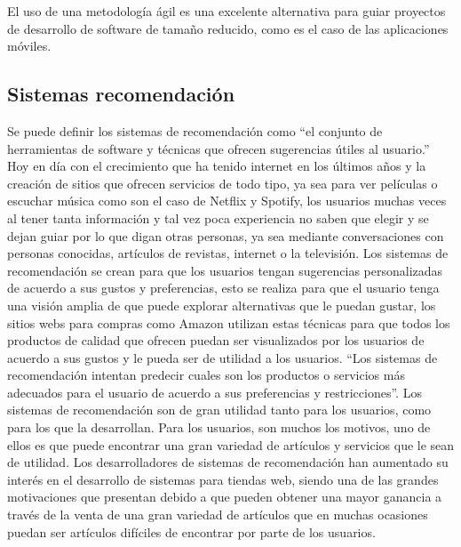 \documentclass[12pt,letterpaper,openany]{book}
\begin{document}
El uso de una metodología ágil es una excelente alternativa para guiar proyectos de desarrollo de software de tamaño reducido, como es el caso de las aplicaciones móviles. 

\subsection{Sistemas recomendación}
Se puede definir los sistemas de recomendación como “el conjunto de herramientas de software y técnicas que ofrecen sugerencias útiles al usuario.” Hoy en día con el crecimiento que ha tenido internet en los últimos años y la creación de sitios que ofrecen servicios de todo tipo, ya sea para ver películas o escuchar música como son el caso de Netflix y Spotify, los usuarios muchas veces al tener tanta información y tal vez poca experiencia no saben que elegir y se dejan guiar por lo que digan otras personas, ya sea mediante conversaciones con personas conocidas, artículos de revistas, internet o la televisión.
\vspace{5mm}\newline
Los sistemas de recomendación se crean para que los usuarios tengan sugerencias personalizadas de acuerdo a sus gustos y preferencias, esto se realiza para que el usuario tenga una visión amplia de que puede explorar alternativas que le puedan gustar, los sitios webs para compras como Amazon utilizan estas técnicas para que todos los productos de calidad que ofrecen puedan ser visualizados por los usuarios de acuerdo a sus gustos y le pueda ser de utilidad a los usuarios. “Los sistemas de recomendación intentan predecir cuales son los productos o servicios más adecuados para el usuario de acuerdo a sus preferencias y restricciones”.
\vspace{5mm}\newline
Los sistemas de recomendación son de gran utilidad tanto para los usuarios, como para los que la desarrollan. Para los usuarios, son muchos los motivos, uno de ellos es que puede encontrar una gran variedad de artículos y servicios que le sean de utilidad. Los desarrolladores de sistemas de recomendación han aumentado su interés en el desarrollo de sistemas para tiendas web, siendo una de las grandes motivaciones que presentan debido a que pueden obtener una mayor ganancia a través de la venta de una gran variedad de artículos que en muchas ocasiones puedan ser artículos difíciles de encontrar por parte de los usuarios. 
\vspace{5mm}\newline
\end{document}
